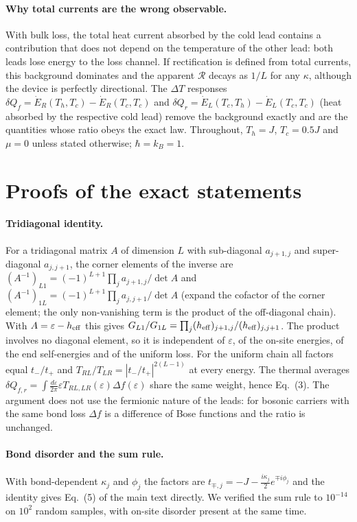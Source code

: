 \documentclass[aps,prl,superscriptaddress,nofootinbib,onecolumn,notitlepage,11pt]{revtex4-2}
\newcommand{\R}{\mathcal{R}}
\newcommand{\dQ}{\delta Q}
\newcommand{\heff}{h_{\rm eff}}
\begin{document}
\paragraph{Why total currents are the wrong observable.}
With bulk loss, the total heat current absorbed by the cold lead contains a contribution that does not depend on the temperature of the other lead: both leads lose energy to the loss channel. If rectification is defined from total currents, this background dominates and the apparent $\R$ decays as $1/L$ for any $\kappa$, although the device is perfectly directional. The $\Delta T$ responses $\dQ_{f}=\dot E_R(T_h,T_c)-\dot E_R(T_c,T_c)$ and $\dQ_r=\dot E_L(T_c,T_h)-\dot E_L(T_c,T_c)$ (heat absorbed by the respective cold lead) remove the background exactly and are the quantities whose ratio obeys the exact law. Throughout, $T_h=J$, $T_c=0.5J$ and $\mu=0$ unless stated otherwise; $\hbar=k_B=1$.

\section{Proofs of the exact statements}
\label{sec:proofs}

\paragraph{Tridiagonal identity.}
For a tridiagonal matrix $A$ of dimension $L$ with sub-diagonal $a_{j+1,j}$ and super-diagonal $a_{j,j+1}$, the corner elements of the inverse are $(A^{-1})_{L1}=(-1)^{L+1}\prod_{j}a_{j+1,j}/\det A$ and $(A^{-1})_{1L}=(-1)^{L+1}\prod_j a_{j,j+1}/\det A$ (expand the cofactor of the corner element; the only non-vanishing term is the product of the off-diagonal chain). With $A=\varepsilon-\heff$ this gives $G_{L1}/G_{1L}=\prod_j(\heff)_{j+1,j}/(\heff)_{j,j+1}$. The product involves no diagonal element, so it is independent of $\varepsilon$, of the on-site energies, of the end self-energies and of the uniform loss. For the uniform chain all factors equal $t_-/t_+$ and $T_{RL}/T_{LR}=|t_-/t_+|^{2(L-1)}$ at every energy. The thermal averages $\dQ_{f,r}=\int\frac{d\varepsilon}{2\pi}\varepsilon T_{RL,LR}(\varepsilon)\Delta f(\varepsilon)$ share the same weight, hence Eq.~(3). The argument does not use the fermionic nature of the leads: for bosonic carriers with the same bond loss $\Delta f$ is a difference of Bose functions and the ratio is unchanged.

\paragraph{Bond disorder and the sum rule.}
With bond-dependent $\kappa_j$ and $\phi_j$ the factors are $t_{\mp,j}=-J-\tfrac{i\kappa_j}{2}e^{\mp i\phi_j}$ and the identity gives Eq.~(5) of the main text directly. We verified the sum rule to $10^{-14}$ on $10^2$ random samples, with on-site disorder present at the same time.
\end{document}

